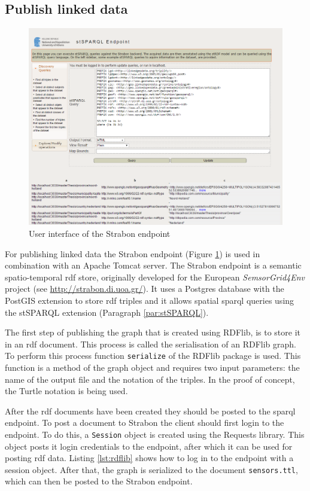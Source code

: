 \subsection{Publish linked data}

\begin{figure}
	\centering
	\includegraphics[width=\linewidth]{figs/Strabon.PNG}
	\caption{User interface of the Strabon endpoint}
	\label{fig:Strabon}
\end{figure}

For publishing linked data the Strabon endpoint (Figure \ref{fig:Strabon}) is used in combination with an Apache Tomcat server. The Strabon endpoint is a semantic spatio-temporal \ac{rdf} store, originally developed for the European  \textit{SemsorGrid4Env} project (see \url{http://strabon.di.uoa.gr/}). It uses a Postgres database with the PostGIS extension to store \ac{rdf} triples and it allows spatial \ac{sparql} queries using the stSPARQL extension (Paragraph \ref{par:stSPARQL}).  

The first step of publishing the graph that is created using RDFlib, is to store it in an \ac{rdf} document. This process is called the serialisation of an RDFlib graph. To perform this process function \texttt{serialize} of the RDFlib package is used. This function is a method of the graph object and requires two input parameters: the name of the output file and the notation of the triples. In the proof of concept, the Turtle notation is being used. 

After the \ac{rdf} documents have been created they should be posted to the \ac{sparql} endpoint. To post a document to Strabon the client should first login to the endpoint. To do this, a \texttt{Session} object is created using the Requests library. This object posts it login credentials to the endpoint, after which it can be used for posting \ac{rdf} data. Listing \ref{lst:rdflib} shows how to log in to the endpoint with a session object. After that, the graph is serialized to the document \texttt{sensors.ttl}, which can then be posted to the Strabon endpoint.   

